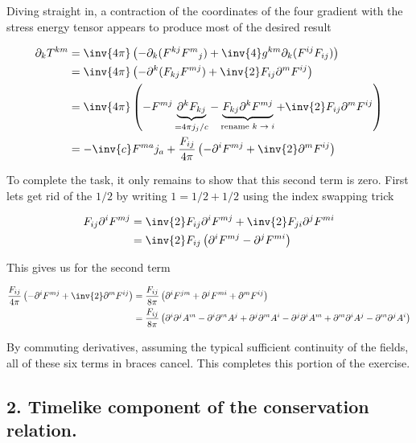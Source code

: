 Diving straight in, a contraction of the coordinates of the four gradient with the stress energy tensor appears to produce most of the desired result

\begin{align*}
\partial_k T^{k m} 
&=
\inv{4 \pi} \left( 
-\partial_k( F^{k j} {F^{m}}_j ) 
+ \inv{4} g^{k m} \partial_k 
(F^{i j} F_{i j}) 
\right) \\
&=
\inv{4 \pi} \left( 
-\partial^k( F_{k j} F^{m j} ) + \inv{2} F_{i j} \partial^m F^{i j} 
\right) \\
&=
\inv{4 \pi} \left( 
-F^{m j} \underbrace{\partial^k F_{k j} }_{= 4 \pi j_j/c}
-\underbrace{F_{k j} \partial^k F^{m j} }_{\text{rename $k \rightarrow i$}}
+ \inv{2} F_{i j} \partial^m F^{i j} 
\right) \\
&=
- \inv{c} F^{m a} j_a
+\frac{F_{i j}}{4 \pi} \left( 
-\partial^i F^{m j} + \inv{2} \partial^m F^{i j} 
\right) \\
\end{align*}

To complete the task, it only remains to show that this second term is zero.  First lets get rid of the $1/2$ by writing $1 = 1/2 + 1/2$ using the index swapping trick

\begin{align*}
F_{i j} \partial^i F^{m j} 
&= 
\inv{2} F_{i j} \partial^i F^{m j} + \inv{2} F_{j i} \partial^j F^{m i} \\
&= 
\inv{2} F_{i j} \left( \partial^i F^{m j} - \partial^j F^{m i} \right)
\end{align*}

This gives us for the second term

\begin{align*}
\frac{F_{i j}}{4 \pi} \left( -\partial^i F^{m j} + \inv{2} \partial^m F^{i j} \right) 
&=
\frac{F_{i j}}{8 \pi} \left( \partial^i F^{j m} + \partial^j F^{m i} + \partial^m F^{i j} \right) \\
&=
\frac{F_{i j}}{8 \pi} \left( 
\partial^i \partial^j A^m
-\partial^i \partial^m A^j
+\partial^j \partial^m A^i
-\partial^j \partial^i A^m
+\partial^m \partial^i A^j
-\partial^m \partial^j A^i
\right) \\
\end{align*}

By commuting derivatives, assuming the typical sufficient continuity of the fields, all of these six terms in braces cancel.  This completes this portion of the exercise.

\subsection{2. Timelike component of the conservation relation.}

